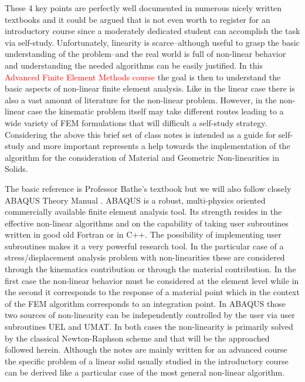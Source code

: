 These 4 key points are perfectly well documented in numerous nicely written textbooks and it could be argued that is not even worth to register for an introductory course since a moderately dedicated student can accomplish the task via self-study. Unfortunately, linearity is scarce--although useful to grasp the basic understanding of the problem--and the real world is full of non-linear behavior and understanding the needed algorithms can be easily justified. In this \textcolor{red}{Advanced Finite Element Methods course} the goal is then to understand the basic aspects of non-linear finite element analysis.  Like in the linear case there is also a vast amount of literature for the non-linear problem.  However, in the non-linear case the kinematic problem itself may take different routes leading to a wide variety of FEM formulations that will difficult a self-study strategy.  Considering the above this brief set of class notes is intended as a guide for self-study and more important represents a help towards the implementation of the algorithm for the consideration of Material and Geometric Non-linearities in Solids.

The basic reference is Professor Bathe's textbook \cite{book:bathe} but we will also follow closely ABAQUS Theory Manual \cite{abaqus_theory}. ABAQUS is a robust, multi-physics oriented commercially available finite element analysis tool. Its strength resides in the effective non-linear algorithms and on the capability of taking user subroutines written in good old Fortran or in C++.  The possibility of implementing user subroutines makes it a very powerful research tool.  In the particular case of a stress/displacement analysis problem with non-linearities these are considered through the kinematics contribution or through the material contribution.  In the first case the non-linear behavior must be considered at the element level while in the second it corresponds to the response of a material point which in the context of the FEM algorithm corresponds to an integration point. In ABAQUS those two sources of non-linearity can be independently controlled by the user via user subroutines UEL and UMAT.  In both cases the non-linearity is primarily solved by the classical Newton-Raphson scheme and that will be the approached followed herein.  Although the notes are mainly written for an advanced course the specific problem of a linear solid usually studied in the introductory course can be derived like a particular case of the most general non-linear algorithm.


